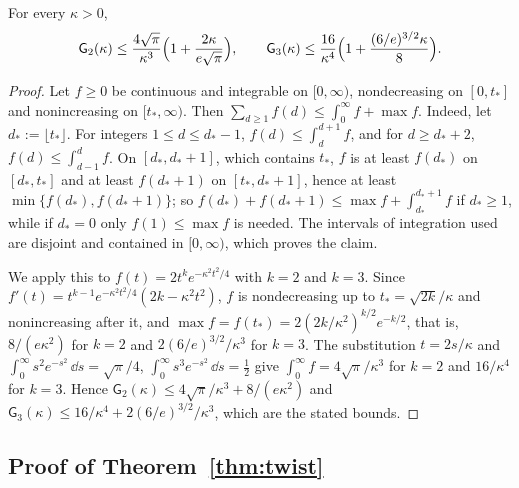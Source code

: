 \begin{lemma}\label{lem:gauss}
For every $\kappa>0$,
\[
\mathsf G_2(\kappa)\le\frac{4\sqrt\pi}{\kappa^3}\Bigl(1+\frac{2\kappa}{e\sqrt\pi}\Bigr),\qquad
\mathsf G_3(\kappa)\le\frac{16}{\kappa^4}\Bigl(1+\frac{(6/e)^{3/2}\kappa}8\Bigr).
\]
\end{lemma}

\begin{proof}
Let $f\ge0$ be continuous and integrable on $[0,\infty)$, nondecreasing on $[0,t_*]$ and nonincreasing on $[t_*,\infty)$.
Then $\sum_{d\ge1}f(d)\le\int_0^\infty f+\max f$. Indeed, let $d_*:=\lfloor t_*\rfloor$. For integers $1\le d\le d_*-1$,
$f(d)\le\int_d^{d+1}f$, and for $d\ge d_*+2$, $f(d)\le\int_{d-1}^df$. On $[d_*,d_*+1]$, which contains $t_*$, $f$ is at least
$f(d_*)$ on $[d_*,t_*]$ and at least $f(d_*+1)$ on $[t_*,d_*+1]$, hence at least $\min\{f(d_*),f(d_*+1)\}$; so
$f(d_*)+f(d_*+1)\le\max f+\int_{d_*}^{d_*+1}f$ if $d_*\ge1$, while if $d_*=0$ only $f(1)\le\max f$ is needed. The intervals of
integration used are disjoint and contained in $[0,\infty)$, which proves the claim.

We apply this to $f(t)=2t^ke^{-\kappa^2t^2/4}$ with $k=2$ and $k=3$. Since $f'(t)=t^{k-1}e^{-\kappa^2t^2/4}(2k-\kappa^2t^2)$, $f$ is
nondecreasing up to $t_*=\sqrt{2k}/\kappa$ and nonincreasing after it, and $\max f=f(t_*)=2(2k/\kappa^2)^{k/2}e^{-k/2}$, that
is, $8/(e\kappa^2)$ for $k=2$ and $2(6/e)^{3/2}/\kappa^3$ for $k=3$. The substitution $t=2s/\kappa$ and
$\int_0^\infty s^2e^{-s^2}\,\dd s=\sqrt\pi/4$, $\int_0^\infty s^3e^{-s^2}\,\dd s=\frac12$ give $\int_0^\infty f=4\sqrt\pi/\kappa^3$ for $k=2$
and $16/\kappa^4$ for $k=3$. Hence $\mathsf G_2(\kappa)\le4\sqrt\pi/\kappa^3+8/(e\kappa^2)$ and
$\mathsf G_3(\kappa)\le16/\kappa^4+2(6/e)^{3/2}/\kappa^3$, which are the stated bounds.
\end{proof}

\subsection{Proof of Theorem~\ref{thm:twist}}

